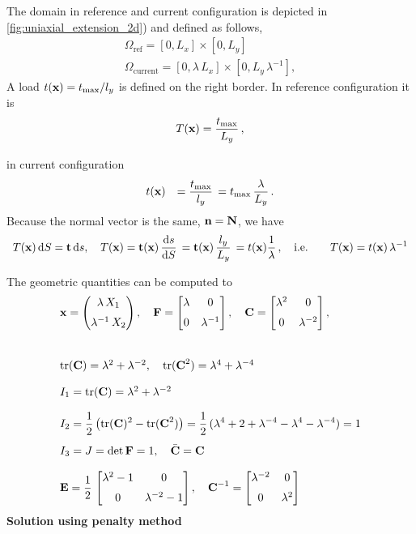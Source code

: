The domain in reference and current configuration is depicted in \cref{fig:uniaxial_extension_2d}) and defined as follows,
\begin{equation*}
  \begin{array}{lll}
    \Omega_\text{ref} = [0, L_x] \times [0, L_y]\\[4mm]
    \Omega_\text{current} = [0, \lambda\,L_x] \times [0, L_y\,\lambda^{-1}],
  \end{array}
\end{equation*}
A load $t(\textbf{x}) = t_\text{max}/l_y$ is defined on the right border. In reference configuration it is
\begin{equation*}
  \begin{array}{lll}
    T(\textbf{x}) = \displaystyle\frac{\displaystyle{t_\text{max}}}{\displaystyle{L_y}}\,,\\[4mm]
  \end{array}
\end{equation*}
in current configuration
\begin{equation*}
  \begin{array}{lll}
    t(\textbf{x}) &= \displaystyle\frac{\displaystyle{t_\text{max}}}{\displaystyle{l_y}}\, = t_\text{max}\,\displaystyle\frac{\displaystyle{\lambda}}{\displaystyle{L_y}}\,.
  \end{array}
\end{equation*}
Because the normal vector is the same, $\textbf{n} = \textbf{N}$, we have
\begin{equation*}
  \begin{array}{lll}
    T(\bfx)\,\d S = \bft\,\d s, \quad T(\bfx) = \bft(\bfx)\,\dfrac{\d s}{\d S} = \bft(\bfx)\, \dfrac{l_y}{L_y} = t(\bfx) \dfrac1{\lambda}, \quad \text{i.e.}\quad \quad T(\bfx) = t(\bfx)\,\lambda^{-1}
  \end{array}
\end{equation*}

The geometric quantities can be computed to
\begin{equation*}
  \begin{array}{lll}
    \textbf{x} = \left(\begin{matrix}\lambda \,X_1\\[2mm]\lambda^{-1}\, X_2 \end{matrix}\right), 
    \quad \textbf{F} = \left[\begin{matrix}\lambda & 0\\[2mm] 0 & \lambda^{-1}\end{matrix}\right],
    \quad \textbf{C} = \left[\begin{matrix}\lambda^2 & 0\\[2mm] 0 & \lambda^{-2} \end{matrix}\right],\\[12mm]
    \mathrm{tr}(\textbf{C}) = \lambda^2 + \lambda^{-2}, \quad \mathrm{tr}(\textbf{C}^2) = \lambda^4 + \lambda^{-4}\\[4mm]
    I_1 = \mathrm{tr}(\textbf{C}) = \lambda^2 + \lambda^{-2} \quad \\[4mm]
    I_2 = \displaystyle\frac{\displaystyle{1}}{\displaystyle{2}}\,\big(\mathrm{tr}(\textbf{C})^2 - \mathrm{tr}(\textbf{C}^2)\big) = \displaystyle\frac{\displaystyle{1}}{\displaystyle{2}}\,(\lambda^4 + 2 + \lambda^{-4} - \lambda^{4} - \lambda^{-4}) = 1 \\[4mm]
    I_3 = J = \hbox{det} \,{\textbf{F}} = 1, \quad \bar{\textbf{C}} = \textbf{C}\\[4mm]
    \textbf{E} = \displaystyle\frac{\displaystyle{1}}{\displaystyle{2}}\,\left[\begin{matrix}\lambda^2-1 & 0 \\[2mm] 0 & \lambda^{-2}-1 \end{matrix}\right], \quad \textbf{C}^{-1} = \left[\begin{matrix}\lambda^{-2} & 0 \\[2mm] 0 & \lambda^{2}\end{matrix}\right]
  \end{array}
\end{equation*}
\textbf{Solution using penalty method}

